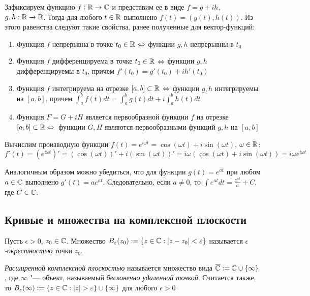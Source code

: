 \begin{note}
	Зафиксируем функцию $f : \mathbb{R} \to \mathbb{C}$ и представим ее в виде $f = g + ih$, $g, h : \mathbb{R} \to \mathbb{R}$. Тогда для любого $t \in \mathbb{R}$ выполнено $f(t) = (g(t), h(t))$. Из этого равенства следуют такие свойства, ранее полученные для вектор-функций:
	\begin{enumerate}
		\item Функция $f$ непрерывна в точке $t_0 \in \mathbb{R}$ $\Leftrightarrow$ функции $g, h$ непрерывны в $t_0$
		\item Функция $f$ дифференцируема в точке $t_0 \in \mathbb{R}$ $\Leftrightarrow$ функции $g, h$ дифференцируемы в $t_0$, причем $f'(t_0) = g'(t_0) + ih'(t_0)$
		\item Функция $f$ интегрируема на отрезке $[a, b] \subset \mathbb{R}$ $\Leftrightarrow$ функции $g, h$ интегрируемы на $[a, b]$, причем $\int_a^bf(t)dt = \int_a^bg(t)dt + i\int_a^bh(t)dt$
		\item Функция $F = G + iH$ является первообразной функции $f$ на отрезке $[a, b] \subset \R \hm\lra$~функции $G, H$ являются первообразными функций $g, h$ на $[a, b]$
	\end{enumerate}
\end{note}

\begin{example}
	Вычислим производную функции $f(t) = e^{i\omega t} = \cos(\omega t) + i\sin(\omega t)$, $\omega \in \mathbb{R}$:
	\[f'(t) = \left(e^{i\omega t}\right)' = \left(\cos(\omega t)\right)' + i \left(\sin(\omega t)\right)' = i\omega(\cos(\omega t) + i\sin(\omega t)) = i\omega e^{i \omega t}\]
	
	Аналогичным образом можно убедиться, что для функции $g(t) = e^{at}$ при любом $a \in \mathbb{C}$ выполнено $g'(t) = ae^{at}$. Следовательно, если $a \ne 0$, то $\int e^{at}dt = \frac{e^{at}}{a} + C$, где $C \in \mathbb{C}$.
\end{example}

\subsection{Кривые и множества на комплексной плоскости}

\begin{definition}
	Пусть $\epsilon > 0$, $z_0 \in \mathbb{C}$. Множество $B_{\varepsilon}(z_0) := \{z \in \mathbb{C}: |z - z_0| < \varepsilon\}$ называется \textit{$\epsilon$-окрестностью} точки $z_0$.
\end{definition}

\begin{definition}
	\textit{Расширенной комплексной плоскостью} называется множество вида $\overline{\mathbb{C}} := \mathbb{C} \cup \{\infty\}$, где $\infty$ "--- объект, называемый \textit{бесконечно удаленной точкой}. Считается также, то $B_{\varepsilon}(\infty) := \{z \in \mathbb{C}: |z| > \varepsilon\} \cup \{\infty\}$ для любого $\epsilon > 0$
\end{definition}

